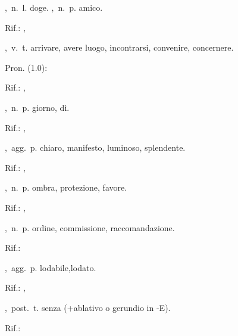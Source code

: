 ,\ n.\ l.
doge.
,\ n.\ p.
amico.
\begin{subvocedue}
\item[Rif.:] , 
\end{subvocedue}
,\ v.\ t.
arrivare, avere luogo, incontrarsi, convenire, concernere.
\begin{subvocedue}
\item[Pron. (1.0):] 
\item[Rif.:] , 
\end{subvocedue}
,\ n.\ p.
giorno, dì.
\begin{subvocedue}
\item[Rif.:] , 
\end{subvocedue}
,\ agg.\ p.
chiaro, manifesto, luminoso, splendente.
\begin{subvocedue}
\item[Rif.:] , 
\end{subvocedue}
,\ n.\ p.
ombra, protezione, favore.
\begin{subvocedue}
\item[Rif.:] , 
\end{subvocedue}
,\ n.\ p.
ordine, commissione, raccomandazione.
\begin{subvocedue}
\item[Rif.:] 
\end{subvocedue}
,\ agg.\ p.
lodabile,lodato.
\begin{subvocedue}
\item[Rif.:] , 
\end{subvocedue}
,\ post.\ t.
senza (+ablativo o gerundio in -E).
\begin{subvocedue}
\item[Rif.:] 
\end{subvocedue}
